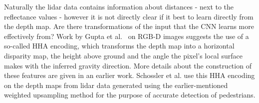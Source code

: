 Naturally the lidar data contains information about distances - next to the reflectance values - however it is not directly clear if it best to learn directly from the depth map. Are there transformations of the input that the CNN learns more effectively from? Work by Gupta et al.~\cite{gupta2014} on RGB-D images suggests the use of a so-called HHA encoding, which transforms the depth map into a horizontal disparity map, the height above ground and the angle the pixel's local surface makes with the inferred gravity direction. More details about the construction of these features are given in an earlier work\cite{gupta2013}. Schossler et al.\cite{schlosser2016} use this HHA encoding on the depth maps from lidar data generated using the earlier-mentioned weighted upsampling method\cite{premebida2014} for the purpose of accurate detection of pedestrians.

